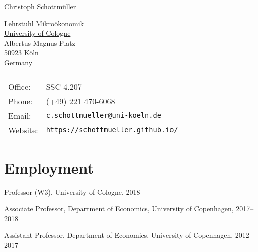\documentclass[a4paper]{article}
\def\name{Christoph Schottm\"uller}
\renewenvironment{itemize}{
  \begin{list}{}{
    \setlength{\leftmargin}{1.5em}
  }
}{
  \end{list}
}
\begin{document}
{\huge \name}


\vspace{0.25in}

\begin{minipage}{0.45\linewidth}
  \href{https://www.microtheory.uni-koeln.de/en/}{Lehrstuhl Mikro\"okonomik} \\
  \href{https://www.wiso.uni-koeln.de/en/en}{University of Cologne} \\
  Albertus Magnus Platz\\
  50923 K\"oln\\Germany
\end{minipage}
\hspace*{-.5cm} %
\begin{minipage}{0.45\linewidth}
  \begin{tabular}{ll} 
&\\
    Office: & SSC 4.207\\
    Phone: & (+49) 221 470-6068 \\
    Email: & {\tt{c.schottmueller@uni-koeln.de}}\\
    Website: & \href{https://schottmueller.github.io/}{\tt https://schottmueller.github.io/}
  \end{tabular}
\end{minipage}


\section*{Employment}

\begin{itemize}
\item Professor (W3), University of Cologne, 2018--
  \item Associate Professor, Department of Economics, University of Copenhagen, 2017--2018
\item Assistant Professor, Department of Economics, University of Copenhagen, 2012--2017
\end{itemize}
\end{document}
